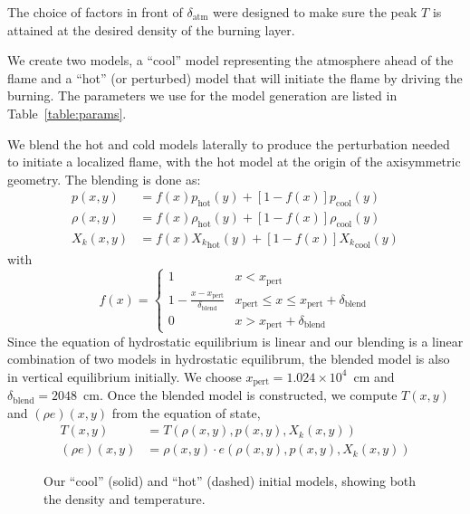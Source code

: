 \documentclass[preprint,times,tighten]{aastex63}
\begin{document}
The choice of factors in front of $\delta_\mathrm{atm}$ were designed
to make sure the peak $T$ is attained at the desired density
of the burning layer.

We create two models, a ``cool'' model representing the atmosphere
ahead of the flame and a ``hot'' (or perturbed) model that will
initiate the flame by driving the burning.  The parameters we use for
the model generation are listed in Table~\ref{table:params}.

We blend the hot and cold models laterally to produce the perturbation
needed to initiate a localized flame, with the hot model at the
origin of the axisymmetric geometry.  The blending is done as:
\begin{align}
p(x,y) &= f(x) p_\mathrm{hot}(y) + [1-f(x)] p_\mathrm{cool}(y) \\
\rho(x,y) &= f(x) \rho_\mathrm{hot}(y) + [1-f(x)] \rho_\mathrm{cool}(y) \\
X_k(x,y) &= f(x) {X_k}_\mathrm{hot}(y) + [1-f(x)] {X_k}_\mathrm{cool}(y)
\end{align}
with
\begin{equation}
f(x) = \begin{cases}
     1 & x < x_\mathrm{pert} \\
   1 - \frac{x - x_\mathrm{pert}}{\delta_\mathrm{blend}} & x_\mathrm{pert} \le x \le x_\mathrm{pert} + \delta_\mathrm{blend} \\
     0 & x > x_\mathrm{pert} + \delta_\mathrm{blend}
\end{cases}
\end{equation}
Since the equation of hydrostatic equilibrium is linear and our
blending is a linear combination of two models in hydrostatic
equilibrum, the blended model is also in vertical equilibrium initially.  We choose
$x_\mathrm{pert} = 1.024\times 10^4$~cm and $\delta_\mathrm{blend} = 2048$~cm.  Once
the blended model is constructed, we compute $T(x,y)$ and $(\rho e)(x,y)$
from the equation of state,
\begin{align}
  T(x,y) &= T(\rho(x,y), p(x,y), X_k(x,y)) \\
  (\rho e)(x,y) &= \rho(x, y) \cdot e(\rho(x,y), p(x,y), X_k(x,y)) 
\end{align}

\begin{figure}[t]
\centering
{}
\caption{\label{fig:initial_models} Our ``cool'' (solid) and ``hot''
  (dashed) initial models, showing both the density and temperature.}
\end{figure}
\end{document}
